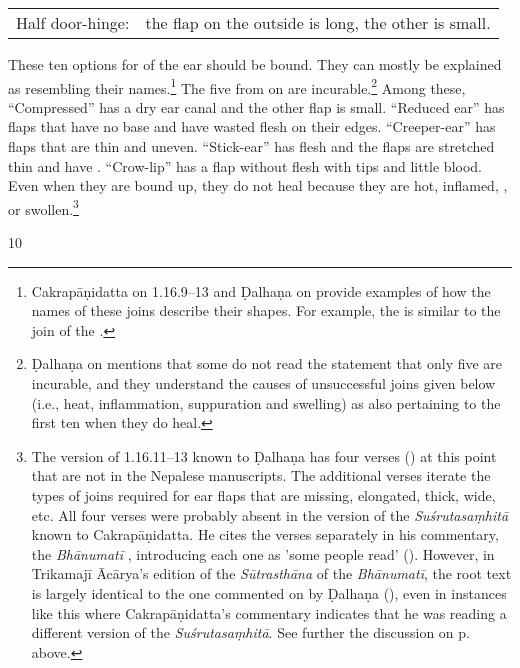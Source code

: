\begin{translation}
\begin{longtable}{rp{}}
    Half door-hinge: & 
    the flap on the outside is long, the other is small.
\end{longtable}
These ten options for  of the ear should be
bound.  They can mostly be explained as resembling their
names.\footnote{Cakrapāṇidatta on 1.16.9–13 \citep[128–129]{acar-1939} and Ḍalhaṇa
    on  provide examples of how the names of these joins describe
    their shapes. For example, the  is similar to the
    join of the .}  The five from
     on are incurable.\footnote{Ḍalhaṇa on
         mentions that some do not read the statement that only five
        are incurable, and they understand the causes of unsuccessful joins given below
        (i.e., heat, inflammation, suppuration and swelling) as also pertaining to the
        first ten when they do heal.}  Among these, “Compressed” has a dry ear canal and
        the other flap is small.   “Reduced ear” has flaps that have no base and have
        wasted flesh on their edges. “Creeper-ear” has flaps that are thin and uneven.
        “Stick-ear” has  flesh and the flaps are stretched thin 
        and
        have  .  “Crow-lip” has a flap 
        without flesh
        with  tips and little blood. Even when they are 
        bound
        up, they do not heal because they are hot, inflamed, 
        , or
        swollen.\footnote{The version of 1.16.11–13 known to Ḍalhaṇa \citep[78]{vulgate}
            has four verses () at this point that are not in the Nepalese
            manuscripts. The additional verses iterate the types of joins required for ear
            flaps that are missing, elongated, thick, wide, etc. All four verses were probably
            absent in the version of the \emph{Suśrutasaṃhitā} known to Cakrapāṇidatta. He
            cites the verses separately in his commentary, the \emph{Bhānumatī}
            \citep[128–129]{acar-1939}, introducing each one as 'some people read' (). However,  in Trikamajī Ācārya's edition of the \emph{Sūtrasthāna}
            of the \emph{Bhānumatī}, the root text is largely identical to the one commented
            on by Ḍalhaṇa (\cite{vulgate}), even in instances like this where Cakrapāṇidatta's
            commentary indicates that he was reading a different version of the
            \emph{Suśrutasaṃhitā}. See further the discussion on p.\,\pageref{skinflap}
            above.} 
            \item[10]
    

\end{translation}
